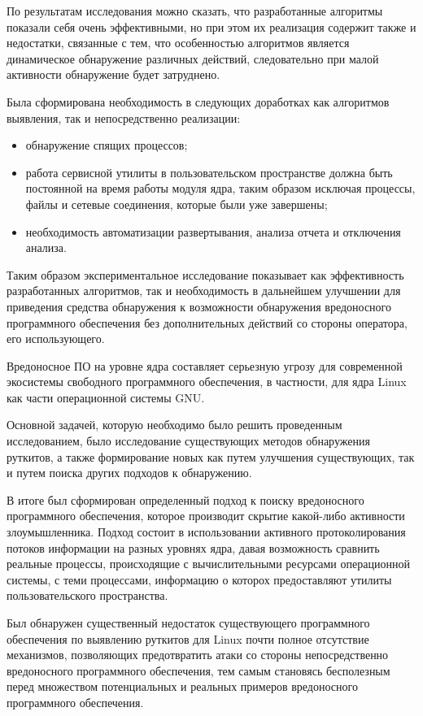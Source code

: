 \documentclass{gost7.32-2001}
\begin{document}
По результатам исследования можно сказать, что разработанные алгоритмы
показали себя очень эффективными, но при этом их реализация содержит
также и недостатки, связанные с тем, что особенностью алгоритмов
является динамическое обнаружение различных действий, следовательно
при малой активности обнаружение будет затруднено.

Была сформирована необходимость в следующих доработках
как алгоритмов выявления, так и непосредственно реализации:
\begin{itemize}
\item
  обнаружение спящих процессов;
\item
  работа сервисной утилиты в пользовательском пространстве должна быть
  постоянной на время работы модуля ядра, таким образом исключая
  процессы, файлы и сетевые соединения, которые были уже завершены;
\item
  необходимость автоматизации развертывания, анализа отчета и
  отключения анализа.
\end{itemize}

Таким образом экспериментальное исследование показывает как
эффективность разработанных алгоритмов, так и необходимость в
дальнейшем улучшении для приведения средства обнаружения к возможности
обнаружения вредоносного программного обеспечения без дополнительных
действий со стороны оператора, его использующего.

Вредоносное ПО на уровне ядра составляет серьезную угрозу для
современной экосистемы свободного программного обеспечения, в
частности, для ядра Linux как части операционной системы GNU.

Основной задачей, которую необходимо было решить проведенным
исследованием, было исследование существующих методов обнаружения
руткитов, а также формирование новых \dash как путем улучшения
существующих, так и путем поиска других подходов к обнаружению.

В итоге был сформирован определенный подход к поиску вредоносного
программного обеспечения, которое производит скрытие какой-либо
активности злоумышленника. Подход состоит в использовании активного
протоколирования потоков информации на разных уровнях ядра, давая
возможность сравнить реальные процессы, происходящие с вычислительными
ресурсами операционной системы, с теми процессами, информацию о
которох предоставляют утилиты пользовательского пространства.

Был обнаружен существенный недостаток существующего программного
обеспечения по выявлению руткитов для Linux \dash почти полное отсутствие
механизмов, позволяющих предотвратить атаки со стороны непосредственно
вредоносного программного обеспечения, тем самым становясь бесполезным
перед множеством потенциальных и реальных примеров вредоносного
программного обеспечения.
\end{document}
